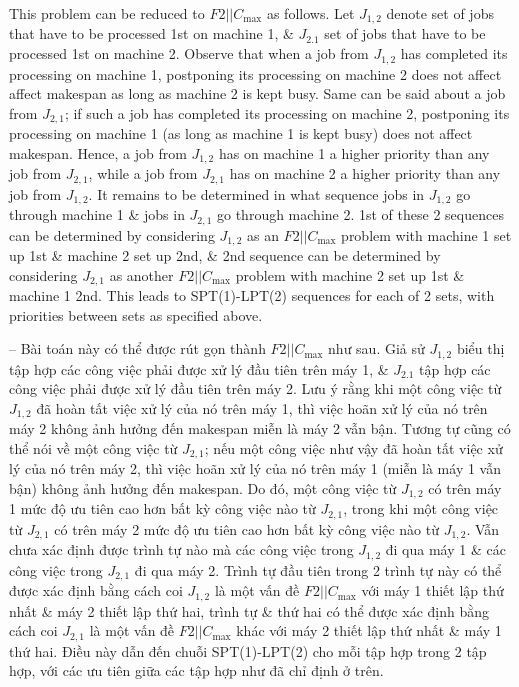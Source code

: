 \documentclass{article}
\begin{document}
\begin{itemize}
\begin{itemize}
        This problem can be reduced to $F2|| C_{\max}$ as follows. Let $J_{1,2}$ denote set of jobs that have to be processed 1st on machine 1, \& $J_{2.1}$ set of jobs that have to be processed 1st on machine 2. Observe that when a job from $J_{1,2}$ has completed its processing on machine 1, postponing its processing on machine 2 does not affect affect makespan as long as machine 2 is kept busy. Same can be said about a job from $J_{2,1}$; if such a job has completed its processing on machine 2, postponing its processing on machine 1 (as long as machine 1 is kept busy) does not affect makespan. Hence, a job from $J_{1,2}$ has on machine 1 a higher priority than any job from $J_{2,1}$, while a job from $J_{2,1}$ has on machine 2 a higher priority than any job from $J_{1,2}$. It remains to be determined in what sequence jobs in $J_{1,2}$ go through machine 1 \& jobs in $J_{2,1}$ go through machine 2. 1st of these 2 sequences can be determined by considering $J_{1,2}$ as an $F2||C_{\max}$ problem with machine 1 set up 1st \& machine 2 set up 2nd, \& 2nd sequence can be determined by considering $J_{2,1}$ as another $F2||C_{\max}$ problem with machine 2 set up 1st \& machine 1 2nd. This leads to SPT(1)-LPT(2) sequences for each of 2 sets, with priorities between sets as specified above.

        -- Bài toán này có thể được rút gọn thành $F2|| C_{\max}$ như sau. Giả sử $J_{1,2}$ biểu thị tập hợp các công việc phải được xử lý đầu tiên trên máy 1, \& $J_{2.1}$ tập hợp các công việc phải được xử lý đầu tiên trên máy 2. Lưu ý rằng khi một công việc từ $J_{1,2}$ đã hoàn tất việc xử lý của nó trên máy 1, thì việc hoãn xử lý của nó trên máy 2 không ảnh hưởng đến makespan miễn là máy 2 vẫn bận. Tương tự cũng có thể nói về một công việc từ $J_{2,1}$; nếu một công việc như vậy đã hoàn tất việc xử lý của nó trên máy 2, thì việc hoãn xử lý của nó trên máy 1 (miễn là máy 1 vẫn bận) không ảnh hưởng đến makespan. Do đó, một công việc từ $J_{1,2}$ có trên máy 1 mức độ ưu tiên cao hơn bất kỳ công việc nào từ $J_{2,1}$, trong khi một công việc từ $J_{2,1}$ có trên máy 2 mức độ ưu tiên cao hơn bất kỳ công việc nào từ $J_{1,2}$. Vẫn chưa xác định được trình tự nào mà các công việc trong $J_{1,2}$ đi qua máy 1 \& các công việc trong $J_{2,1}$ đi qua máy 2. Trình tự đầu tiên trong 2 trình tự này có thể được xác định bằng cách coi $J_{1,2}$ là một vấn đề $F2||C_{\max}$ với máy 1 thiết lập thứ nhất \& máy 2 thiết lập thứ hai, trình tự \& thứ hai có thể được xác định bằng cách coi $J_{2,1}$ là một vấn đề $F2||C_{\max}$ khác với máy 2 thiết lập thứ nhất \& máy 1 thứ hai. Điều này dẫn đến chuỗi SPT(1)-LPT(2) cho mỗi tập hợp trong 2 tập hợp, với các ưu tiên giữa các tập hợp như đã chỉ định ở trên.


\end{itemize}
\end{itemize}
\end{document}
